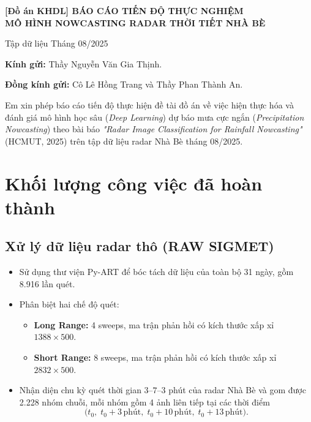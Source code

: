 \documentclass[12pt, a4paper]{article}
\begin{document}
\begin{center}
    {\Large\bfseries [Đồ án KHDL] BÁO CÁO TIẾN ĐỘ THỰC NGHIỆM\\
    MÔ HÌNH NOWCASTING RADAR THỜI TIẾT NHÀ BÈ\par}
    \vspace{0.3em}
    {\large Tập dữ liệu Tháng 08/2025\par}
\end{center}

\textbf{Kính gửi:} Thầy Nguyễn Văn Gia Thịnh.\par
\textbf{Đồng kính gửi:} Cô Lê Hồng Trang và Thầy Phan Thành An.

Em xin phép báo cáo tiến độ thực hiện đề tài đồ án về việc hiện thực hóa và đánh giá mô hình học sâu (\textit{Deep Learning}) dự báo mưa cực ngắn (\textit{Precipitation Nowcasting}) theo bài báo \textit{"Radar Image Classification for Rainfall Nowcasting"} (HCMUT, 2025) trên tập dữ liệu radar Nhà Bè tháng 08/2025.

%
%


\section{Khối lượng công việc đã hoàn thành}

\subsection{Xử lý dữ liệu radar thô (RAW SIGMET)}
\begin{itemize}[leftmargin=*]
    \item Sử dụng thư viện Py-ART để bóc tách dữ liệu của toàn bộ 31 ngày, gồm 8.916 lần quét.
    \item Phân biệt hai chế độ quét:
    \begin{itemize}
        \item \textbf{Long Range:} 4 sweeps, ma trận phản hồi có kích thước xấp xỉ $1388 \times 500$.
        \item \textbf{Short Range:} 8 sweeps, ma trận phản hồi có kích thước xấp xỉ $2832 \times 500$.
    \end{itemize}
    \item Nhận diện chu kỳ quét thời gian $3$--$7$--$3$ phút của radar Nhà Bè và gom được 2.228 nhóm chuỗi, mỗi nhóm gồm 4 ảnh liên tiếp tại các thời điểm
    \[
        \bigl(t_0,\; t_0 + 3\,\text{phút},\; t_0 + 10\,\text{phút},\; t_0 + 13\,\text{phút}\bigr).
    \]
\end{itemize}
\end{document}
